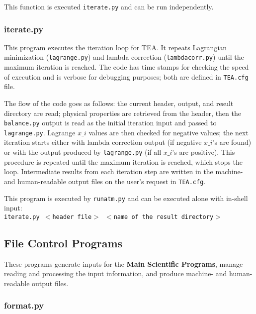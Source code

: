 This function is executed \texttt{iterate.py} and can be run
independently.

\subsubsection{iterate.py}

This program executes the iteration loop for TEA. It repeats
Lagrangian minimization \newline (\texttt{lagrange.py}) and lambda
correction (\texttt{lambdacorr.py}) until the maximum iteration is
reached. The code has time stamps for checking the speed of execution
and is verbose for debugging purposes; both are defined
in \texttt{TEA.cfg} file.

The flow of the code goes as follows: the current header, output, and
result directory are read; physical properties are retrieved from the
header, then the \texttt{balance.py} output is read as the initial
iteration input and passed to \texttt{lagrange.py}. Lagrange $x\_i$
values are then checked for negative values; the next iteration starts
either with lambda correction output (if negative $x\_i$'s are found)
or with the output produced by \texttt{lagrange.py} (if all $x\_i$'s
are positive). This procedure is repeated until the maximum iteration
is reached, which stops the loop. Intermediate results from each
iteration step are written in the machine- and human-readable output
files on the user's request in \texttt{TEA.cfg}.

This program is executed by \texttt{runatm.py} and can be executed
alone with in-shell input: \\
\texttt{iterate.py $<$header file$>$ $<$name of the result directory$>$}



\subsection{File Control Programs} 

These programs generate inputs for the {\bf Main Scientific
Programs}, manage reading and processing the input information, and
produce machine- and human-readable output files.

\subsubsection{format.py}


